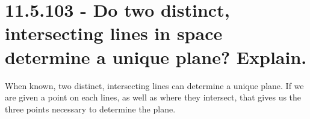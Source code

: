 \documentclass{article}
\begin{document}
\section{11.5.103 - Do two distinct, intersecting lines in space determine a unique plane?  Explain.}

\par\noindent When known, two distinct, intersecting lines can determine a unique plane.  If we are given a point on each lines, as well as where they intersect, that gives us the three points necessary to determine the plane.
\end{document}
